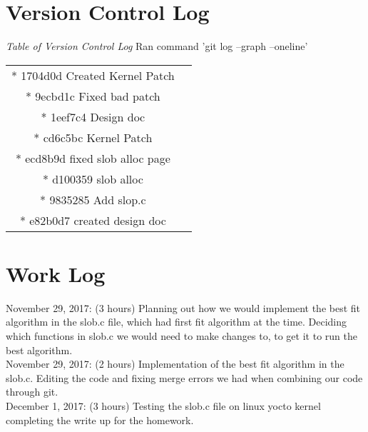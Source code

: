 \documentclass{article}
\begin{document}
\section*{Version Control Log}
\textit{Table of Version Control Log} Ran command 'git log --graph --oneline'
\newline
\begin{center}
\begin{tabular}{ c c }
* 1704d0d Created Kernel Patch \\
* 9ecbd1c Fixed bad patch \\
* 1eef7c4 Design doc \\
* cd6c5bc Kernel Patch \\
* ecd8b9d fixed slob alloc page \\
* d100359 slob alloc \\
* 9835285 Add slop.c \\
* e82b0d7 created design doc
\end{tabular}
\end{center}

\section*{Work Log}
November 29, 2017: (3 hours) Planning out how we would implement the best fit algorithm in the slob.c file, which had first fit algorithm at the time. Deciding which functions in slob.c we would need to make changes to, to get it to run the best algorithm.  \\
November 29, 2017: (2 hours) Implementation of the best fit algorithm in the slob.c. Editing the code and fixing merge errors we had when combining our code through git. \\
December 1, 2017: (3 hours) Testing the slob.c file on linux yocto kernel completing the write up for the homework.
\end{document}
